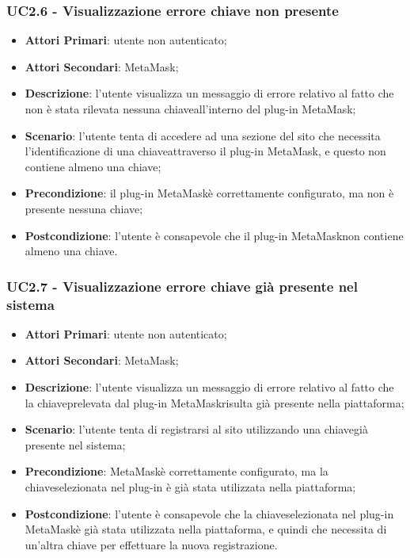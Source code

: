\subsubsection{UC2.6 - Visualizzazione errore chiave non 
	presente}
\begin{itemize}
	\item \textbf{Attori Primari}: utente non autenticato;
	\item \textbf{Attori Secondari}: MetaMask\glo;
	\item \textbf{Descrizione}:
	l'utente visualizza un messaggio di errore relativo al fatto che non è stata rilevata nessuna chiave\glosp all'interno del plug-in MetaMask\glo;
	\item \textbf{Scenario}: l'utente tenta di accedere ad una sezione del sito che necessita l'identificazione di una chiave\glosp attraverso il plug-in MetaMask\glo, e questo non contiene almeno una chiave\glo;
	\item \textbf{Precondizione}: il plug-in MetaMask\glosp è correttamente configurato, ma non è presente nessuna chiave\glo;
	\item \textbf{Postcondizione}:
	l'utente è consapevole che il plug-in MetaMask\glosp non contiene almeno una chiave\glo.

\end{itemize}




\subsubsection{UC2.7 - Visualizzazione errore chiave già presente nel sistema}
\begin{itemize}
	\item \textbf{Attori Primari}: utente non autenticato;
	\item \textbf{Attori Secondari}: MetaMask\glo;
	\item \textbf{Descrizione}:
	l'utente visualizza un messaggio di errore relativo al fatto che la chiave\glosp prelevata dal plug-in MetaMask\glosp risulta già presente nella piattaforma;
	\item \textbf{Scenario}: l'utente tenta di registrarsi al sito utilizzando una chiave\glosp già presente nel sistema;
	\item \textbf{Precondizione}: MetaMask\glosp è correttamente configurato, ma la chiave\glosp selezionata nel plug-in è già stata utilizzata nella piattaforma;
	\item \textbf{Postcondizione}:
	l'utente è consapevole che la chiave\glosp selezionata nel plug-in MetaMask\glosp è già stata utilizzata nella piattaforma, e quindi che necessita di un'altra chiave per effettuare la nuova registrazione.
\end{itemize}

